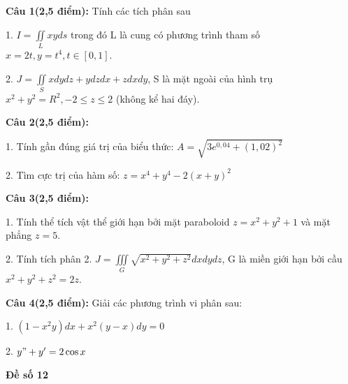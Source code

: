\documentclass[14pt, a4paper]{article}
\begin{document}
	\textbf{Câu 1(2,5 điểm):} Tính các tích phân sau
	
	1. $ I = \iint\limits_L {xyds} $ trong đó L là cung có phương trình tham số  $ x=2t, y={t^4}, t \in [0,1] $.
	
	2. $ J = \iint\limits_S {xdydz + ydzdx} + zdxdy $, S là mặt ngoài của hình trụ $ {x^2} + {y^2} = {R^2}, -2 \leqslant z \leqslant 2 $ (không kể hai đáy).
	
	\vspace{0.5cm}
	
	\textbf{Câu 2(2,5 điểm):}
	
	1. Tính gần đúng giá trị của biểu thức: $ A = \sqrt{3e^{0,04}+(1,02)^{2}} $
	
	2. Tìm cực trị của hàm số: $ z=x^{4}+y^{4}-2(x+y)^{2} $
	
	\vspace{0.5cm}
	
	\textbf{Câu 3(2,5 điểm):}
	
	1. Tính thể tích vật thể giới hạn bởi mặt paraboloid $ z=x^{2}+y^{2}+1 $ và mặt phẳng $ z=5 $.
	
	2. Tính tích phân 2. $ J = \iiint\limits_G {\sqrt{x^{2}+y^{2}+z^{2}}dxdydz} $, G là miền giới hạn bởi cầu $ x^{2}+y^{2}+z^{2}=2z $.
	
	\vspace{0.5cm}
	
	\textbf{Câu 4(2,5 điểm):} Giải các phương trình vi phân sau:
	
	1. $ (1-x^{2}y)dx+x^{2}(y-x)dy=0 $
	
	2. $ y"+y'=2\cos{x} $
	
	\pagebreak
	
	\begin{center}
		{\large \textbf{Đề số 12}}
	\end{center}
	
	
	
\end{document}
